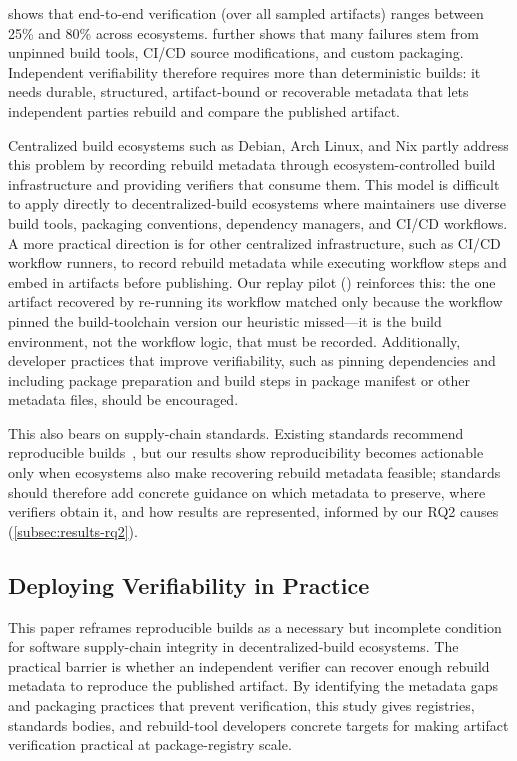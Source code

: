  shows that end-to-end verification (over all sampled artifacts) ranges between 25\% and 80\% across ecosystems.
 further shows that many failures stem from unpinned build tools, CI/CD source modifications, and custom packaging.
Independent verifiability therefore requires more than deterministic builds: it needs durable, structured, artifact-bound or recoverable metadata that lets independent parties rebuild and compare the published artifact.

Centralized build ecosystems such as Debian, Arch Linux, and Nix partly address this problem by recording rebuild metadata through ecosystem-controlled build infrastructure and providing verifiers that consume them.
This model is difficult to apply directly to decentralized-build ecosystems where maintainers use diverse build tools, packaging conventions, dependency managers, and CI/CD workflows.
A more practical direction is for other centralized infrastructure, such as CI/CD workflow runners, to record rebuild metadata while executing workflow steps and embed in artifacts before publishing.
Our replay pilot () reinforces this: the one artifact recovered by re-running its workflow matched only because the workflow pinned the build-toolchain version our heuristic missed---it is the build environment, not the workflow logic, that must be recorded.
Additionally, developer practices that improve verifiability, such as pinning dependencies and including package preparation and build steps in package manifest or other metadata files, should be encouraged.

This also bears on supply-chain standards. Existing standards recommend reproducible builds~\cite{noauthor_securing_nodate}, but our results show reproducibility becomes actionable only when ecosystems also make recovering rebuild metadata feasible; standards should therefore add concrete guidance on which metadata to preserve, where verifiers obtain it, and how results are represented, informed by our RQ2 causes (\cref{subsec:results-rq2}).

\subsection{Deploying Verifiability in Practice}
\label{subsec:discussion-deploying-verifiability}

This paper reframes reproducible builds as a necessary but incomplete condition for software supply-chain integrity in decentralized-build ecosystems.
The practical barrier is whether an independent verifier can recover enough rebuild metadata to reproduce the published artifact. 
By identifying the metadata gaps and packaging practices that prevent verification, this study gives registries, standards bodies, and rebuild-tool developers concrete targets for making artifact verification practical at package-registry scale.

